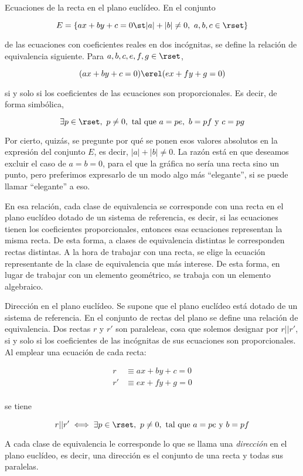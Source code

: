 \begin{example}
  Ecuaciones de la recta en el plano euclídeo. En el conjunto

  \[ E = \{ax + by + c = 0 \st |a| + |b| \neq 0, \ a, b, c \in \rset\} \]

  \noindent de las ecuaciones con coeficientes reales en dos incógnitas, se
  define la relación de equivalencia siguiente. Para $a, b, c, e, f, g \in
  \rset$,

  \[ (ax + by + c = 0) \erel (ex + fy + g = 0) \]

  \noindent si y solo si los coeficientes de las ecuaciones son
  proporcionales. Es decir, de forma simbólica,

  \[ \exists p \in \rset, \ p \neq 0, \ \text{tal que} \ a = pe, \ b = pf \
  \text{y} \ c = pg \]

  \noindent Por cierto, quizás, se pregunte por qué se ponen esos valores
  absolutos en la expresión del conjunto $E$, es decir, $|a| + |b| \neq 0$.
  La razón está en que deseamos excluir el caso de $a = b = 0$, para el que
  la gráfica no sería una recta sino un punto, pero preferimos expresarlo de
  un modo algo más ``elegante'', si se puede llamar ``elegante'' a eso.

  En esa relación, cada clase de equivalencia se corresponde con una recta
  en el plano euclídeo dotado de un sistema de referencia, es decir, si las
  ecuaciones tienen los coeficientes proporcionales, entonces esas
  ecuaciones representan la misma recta. De esta forma, a clases de
  equivalencia distintas le corresponden rectas distintas. A la hora de
  trabajar con una recta, se elige la ecuación representante de la clase de
  equivalencia que más interese. De esta forma, en lugar de trabajar con un
  elemento geométrico, se trabaja con un elemento algebraico.
\end{example}

\begin{example}
  Dirección en el plano euclídeo. Se supone que el plano euclídeo está
  dotado de un sistema de referencia. En el conjunto de rectas del plano se
  define una relación de equivalencia. Dos rectas $r$ y $r'$ son paraleleas,
  cosa que solemos designar por $r || r'$, si y solo si los coeficientes de
  las incógnitas de sus ecuaciones son proporcionales. Al emplear una
  ecuación de cada recta:

  \begin{align*}
    r   &\equiv ax + by + c = 0 \\
    r'  &\equiv ex + fy + g = 0 \\
  \end{align*}

  \noindent se tiene

  \[ r || r' \iff \exists p \in \rset, \ p \neq 0, \ \text{tal que} \ a = pe
  \ \text{y} \ b = pf \]

  A cada clase de equivalencia le corresponde lo que se llama una
  \emph{dirección} en el plano euclídeo, es decir, una dirección es el
  conjunto de una recta y todas sus paralelas.
\end{example}

